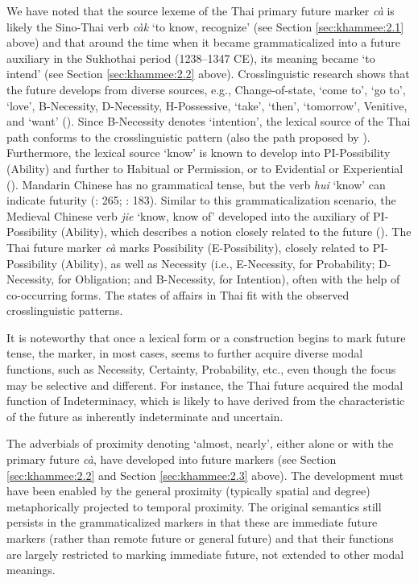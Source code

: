 \documentclass[output=paper,colorlinks,citecolor=brown]{langscibook}
\begin{document}
We have noted that the source lexeme of the Thai primary future marker \textit{cà} is likely the Sino-Thai verb \textit{càk} ‘to know, recognize’ (see Section \ref{sec:khammee:2.1} above) and that around the time when it became grammaticalized into a future auxiliary in the Sukhothai period (1238--1347 CE), its meaning became ‘to intend’ (see Section \ref{sec:khammee:2.2} above). Crosslinguistic research shows that the future develops from diverse sources, e.g., Change-of-state, ‘come to’, ‘go to’, ‘love’, B-Necessity, D-Necessity, H-Possessive, ‘take’, ‘then’, ‘tomorrow’, Venitive, and ‘want’ (\cite{Kuteva2019}). Since B-Necessity denotes ‘intention’, the lexical source of the Thai path conforms to the crosslinguistic pattern (also the path proposed by \cite{BybeePerkinsPagliuca1994}). Furthermore, the lexical source ‘know’ is known to develop into PI-Possibility (Ability) and further to Habitual or Permission, or to Evidential or Experiential (\cite{Kuteva2019}). Mandarin Chinese has no grammatical tense, but the verb \textit{hui} ‘know’ can indicate futurity (\cite{BybeePerkinsPagliuca1994}: 265; \cite{LiThompson1989}: 183). Similar to this grammaticalization scenario, the Medieval Chinese verb \textit{jie} ‘know, know of’ developed into the auxiliary of PI-Possibility (Ability), which describes a notion closely related to the future (\cite{LongEtAl2012}). The Thai future marker \textit{cà} marks Possibility (E-Possibility), closely related to PI-Possibility (Ability), as well as Necessity (i.e., E-Necessity, for Probability; D-Necessity, for Obligation; and B-Necessity, for Intention), often with the help of co-occurring forms. The states of affairs in Thai fit with the observed crosslinguistic patterns.

It is noteworthy that once a lexical form or a construction begins to mark future tense, the marker, in most cases, seems to further acquire diverse modal functions, such as Necessity, Certainty, Probability, etc., even though the focus may be selective and different. For instance, the Thai future acquired the modal function of Indeterminacy, which is likely to have derived from the characteristic of the future as inherently indeterminate and uncertain. 

The adverbials of proximity denoting ‘almost, nearly’, either alone or with the primary future \textit{cà}, have developed into future markers (see Section \ref{sec:khammee:2.2} and Section \ref{sec:khammee:2.3} above). The development must have been enabled by the general proximity (typically spatial and degree) metaphorically projected to temporal proximity. The original semantics still persists in the grammaticalized markers in that these are immediate future markers (rather than remote future or general future) and that their functions are largely restricted to marking immediate future, not extended to other modal meanings.
\end{document}
